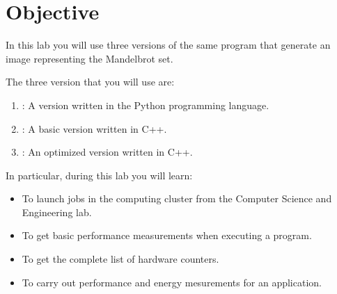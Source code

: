\section{Objective}

In this lab you will use three versions of the same program
that generate an image representing the Mandelbrot set.

The three version that you will use are:

\begin{enumerate}
  \item {}: 
        A version written in the Python programming language.
  \item {}: 
        A basic version written in C++.
  \item {}: 
        An optimized version written in C++.
\end{enumerate}

In particular, during this lab you will learn:


\begin{itemize}
  \item To launch jobs in the computing cluster from the Computer Science and Engineering lab.
  \item To get basic performance measurements when executing a program.
  \item To get the complete list of hardware counters.
  \item To carry out performance and energy mesurements for an application.
\end{itemize}

